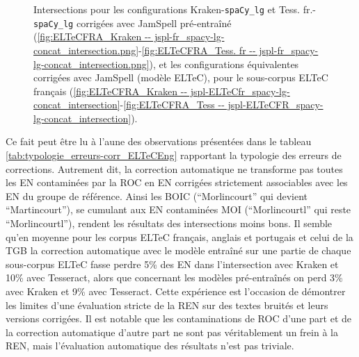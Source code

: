 \begin{figure}[h!]
\begin{minipage}{7cm}
\begin{subfigure}{1\textwidth}
  \end{subfigure}
    \end{minipage}
\caption{Intersections pour les configurations Kraken-\texttt{spaCy\_lg} et Tess. fr.-\texttt{spaCy\_lg} corrigées avec JamSpell pré-entraîné (\ref{fig:ELTeCFRA_Kraken -- jspl-fr_spacy-lg-concat_intersection.png}-\ref{fig:ELTeCFRA_Tess. fr -- jspl-fr_spacy-lg-concat_intersection.png}), et les configurations équivalentes corrigées avec JamSpell (modèle ELTeC), pour le sous-corpus ELTeC français (\ref{fig:ELTeCFRA_Kraken -- jspl-ELTeCfr_spacy-lg-concat_intersection}-\ref{fig:ELTeCFRA_Tess -- jspl-ELTeCFR_spacy-lg-concat_intersection}).}
\label{fig:intersection_globale-kraken}
\end{figure}

Ce fait peut être lu à l'aune des observations présentées dans le tableau \ref{tab:typologie_erreurs-corr_ELTeCEng} rapportant la typologie des erreurs de corrections. Autrement dit, la correction automatique ne transforme pas toutes les EN contaminées par la ROC en EN corrigées strictement associables avec les EN du groupe de référence. Ainsi les BOIC (``Morlincourt'' qui devient ``Martincourt''), se cumulant aux EN contaminées MOI (``Morlincourtl'' qui reste ``Morlincourtl''), rendent les résultats des intersections moins bons. Il semble qu'en moyenne pour les corpus ELTeC français, anglais et portugais et celui de la TGB la correction automatique avec le modèle entraîné sur une partie de chaque sous-corpus ELTeC fasse perdre 5\% des EN dans l'intersection avec Kraken et 10\% avec Tesseract, alors que concernant les modèles pré-entraînés on perd 3\% avec Kraken et 9\% avec Tesseract. Cette expérience est l'occasion de démontrer les limites d'une évaluation stricte de la REN sur des textes bruités et leurs versions corrigées. Il est notable que les contaminations de ROC d'une part et de la correction automatique d'autre part ne sont pas véritablement un frein à la REN, mais l'évaluation automatique des résultats n'est pas triviale.


